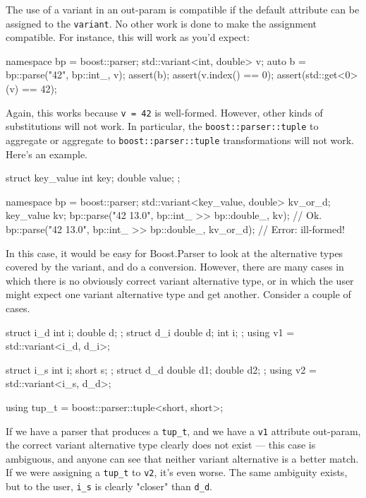 The use of a variant in an out-param is compatible if the default attribute can be assigned to the \texttt{variant}. No other work is done to make the assignment compatible. For instance, this will work as you'd expect:

\begin{code}
namespace bp = boost::parser;
std::variant<int, double> v;
auto b = bp::parse("42", bp::int_, v);
assert(b);
assert(v.index() == 0);
assert(std::get<0>(v) == 42);
\end{code}

Again, this works because \texttt{v = 42} is well-formed. However, other kinds of substitutions will not work. In particular, the \texttt{boost::parser::tuple} to aggregate or aggregate to \texttt{boost::parser::tuple} transformations will not work. Here's an example.

\begin{code}
struct key_value
{
    int key;
    double value;
};

namespace bp = boost::parser;
std::variant<key_value, double> kv_or_d;
key_value kv;
bp::parse("42 13.0", bp::int_ >> bp::double_, kv);      // Ok.
bp::parse("42 13.0", bp::int_ >> bp::double_, kv_or_d); // Error: ill-formed!
\end{code}

In this case, it would be easy for Boost.Parser to look at the alternative types covered by the variant, and do a conversion. However, there are many cases in which there is no obviously correct variant alternative type, or in which the user might expect one variant alternative type and get another. Consider a couple of cases.

\begin{code}
struct i_d { int i; double d; };
struct d_i { double d; int i; };
using v1 = std::variant<i_d, d_i>;

struct i_s { int i; short s; };
struct d_d { double d1; double d2; };
using v2 = std::variant<i_s, d_d>;

using tup_t = boost::parser::tuple<short, short>;
\end{code}

If we have a parser that produces a \texttt{tup\_t}, and we have a \texttt{v1} attribute out-param, the correct variant alternative type clearly does not exist --- this case is ambiguous, and anyone can see that neither variant alternative is a better match. If we were assigning a \texttt{tup\_t} to \texttt{v2}, it's even worse. The same ambiguity exists, but to the user, \texttt{i\_s} is clearly "closer" than \texttt{d\_d}.

